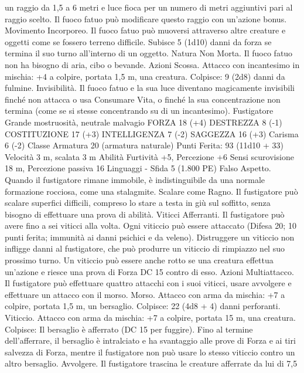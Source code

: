 \begin{multicols}{2}
un raggio da 1,5 a 6 metri e luce fioca per un numero di metri
aggiuntivi pari al raggio scelto. Il fuoco fatuo può modificare
questo raggio con un’azione bonus.
Movimento Incorporeo. Il fuoco fatuo può muoversi attraverso
altre creature e oggetti come se fossero terreno difficile. Subisce
5 (1d10) danni da forza se termina il suo turno all’interno di un
oggetto.
Natura Non Morta. Il fuoco fatuo non ha bisogno di aria, cibo o
bevande.
Azioni
Scossa. Attacco con incantesimo in mischia: +4 a colpire, portata
1,5 m, una creatura.
Colpisce: 9 (2d8) danni da fulmine.
Invisibilità. Il fuoco fatuo e la sua luce diventano magicamente
invisibili finché non attacca o usa Consumare Vita, o finché la
sua concentrazione non termina (come se si stesse concentrando
su di un incantesimo).
Fustigatore
Grande mostruosità, neutrale malvagio
FORZA 18 (+4)
DESTREZZA 8 (-1)
COSTITUZIONE 17 (+3)
INTELLIGENZA 7 (-2)
SAGGEZZA 16 (+3)
Carisma 6 (-2)
Classe Armatura 20 (armatura naturale)
\hspace*{0pt}\hfill{Punti Ferita}: 93 (11d10 + 33)
Velocità 3 m, scalata 3 m
Abilità Furtività +5, Percezione +6
Sensi scurovisione 18 m, Percezione passiva 16
Linguaggi -
Sfida 5 (1.800 PE)
Falso Aspetto. Quando il fustigatore rimane immobile, è
indistinguibile da una normale formazione rocciosa, come una
stalagmite.
Scalare come Ragno. Il fustigatore può scalare superfici difficili,
compreso lo stare a testa in giù sul soffitto, senza bisogno di
effettuare una prova di abilità.
Viticci Afferranti. Il fustigatore può avere fino a sei viticci alla
volta. Ogni viticcio può essere attaccato (Difesa 20; 10 punti ferita;
immunità ai danni psichici e da veleno). Distruggere un viticcio
non infligge danni al fustigatore, che può produrre un viticcio di
rimpiazzo nel suo prossimo turno. Un viticcio può essere anche
rotto se una creatura effettua un’azione e riesce una prova di
Forza DC 15 contro di esso.
Azioni
Multiattacco. Il fustigatore può effettuare quattro attacchi con i
suoi viticci, usare avvolgere e effettuare un attacco con il morso.
Morso. Attacco con arma da mischia: +7 a colpire, portata 1,5
m, un bersaglio.
Colpisce: 22 (4d8 + 4) danni perforanti.
Viticcio. Attacco con arma da mischia: +7 a colpire, portata 15
m, una creatura.
Colpisce: Il bersaglio è afferrato (DC 15 per fuggire). Fino al
termine dell’afferrare, il bersaglio è intralciato e ha svantaggio
alle prove di Forza e ai tiri salvezza di Forza, mentre il
fustigatore non può usare lo stesso viticcio contro un altro
bersaglio.
Avvolgere. Il fustigatore trascina le creature afferrate da lui di 7,5

\end{multicols}
